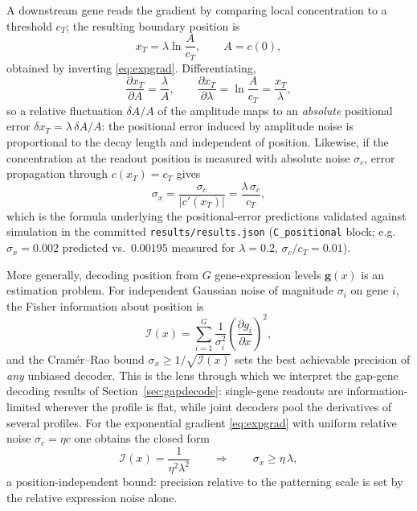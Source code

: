 A downstream gene reads the gradient by comparing local concentration to a
threshold $c_T$; the resulting boundary position is
\begin{equation}
x_T = \lambda \ln\!\frac{A}{c_T}, \qquad A = c(0),
\label{eq:threshold}
\end{equation}
obtained by inverting \eqref{eq:expgrad}. Differentiating,
\begin{equation}
\frac{\partial x_T}{\partial A} = \frac{\lambda}{A}, \qquad
\frac{\partial x_T}{\partial \lambda} = \ln \frac{A}{c_T} = \frac{x_T}{\lambda},
\label{eq:sensitivities}
\end{equation}
so a relative fluctuation $\delta A / A$ of the amplitude maps to an
\emph{absolute} positional error $\delta x_T = \lambda\, \delta A / A$: the
positional error induced by amplitude noise is proportional to the decay
length and independent of position. Likewise, if the concentration at the
readout position is measured with absolute noise $\sigma_c$, error propagation
through $c(x_T) = c_T$ gives
\begin{equation}
\sigma_x = \frac{\sigma_c}{|c'(x_T)|} = \frac{\lambda\,\sigma_c}{c_T},
\label{eq:readouterr}
\end{equation}
which is the formula underlying the positional-error predictions validated
against simulation in the committed \texttt{results/results.json}
(\texttt{C\_positional} block; e.g.\ $\sigma_x = 0.002$ predicted vs.\ $0.00195$
measured for $\lambda = 0.2$, $\sigma_c/c_T = 0.01$).

More generally, decoding position from $G$ gene-expression levels
$\mathbf{g}(x)$ is an estimation problem. For independent Gaussian noise of
magnitude $\sigma_i$ on gene $i$, the Fisher information about position is
\begin{equation}
\mathcal{I}(x) = \sum_{i=1}^{G} \frac{1}{\sigma_i^2}
\left( \frac{\partial g_i}{\partial x} \right)^{\!2},
\label{eq:fisher}
\end{equation}
and the Cram\'er--Rao bound $\sigma_x \ge 1/\sqrt{\mathcal{I}(x)}$ sets the
best achievable precision of \emph{any} unbiased decoder. This is the lens
through which we interpret the gap-gene decoding results of
Section~\ref{sec:gapdecode}: single-gene readouts are information-limited
wherever the profile is flat, while joint decoders pool the derivatives of
several profiles. For the exponential gradient \eqref{eq:expgrad} with
uniform relative noise $\sigma_c = \eta c$ one obtains the closed form
\begin{equation}
\mathcal{I}(x) = \frac{1}{\eta^2 \lambda^2}
\qquad\Longrightarrow\qquad
\sigma_x \ge \eta\,\lambda,
\label{eq:crbound}
\end{equation}
a position-independent bound: precision relative to the patterning scale is
set by the relative expression noise alone.

